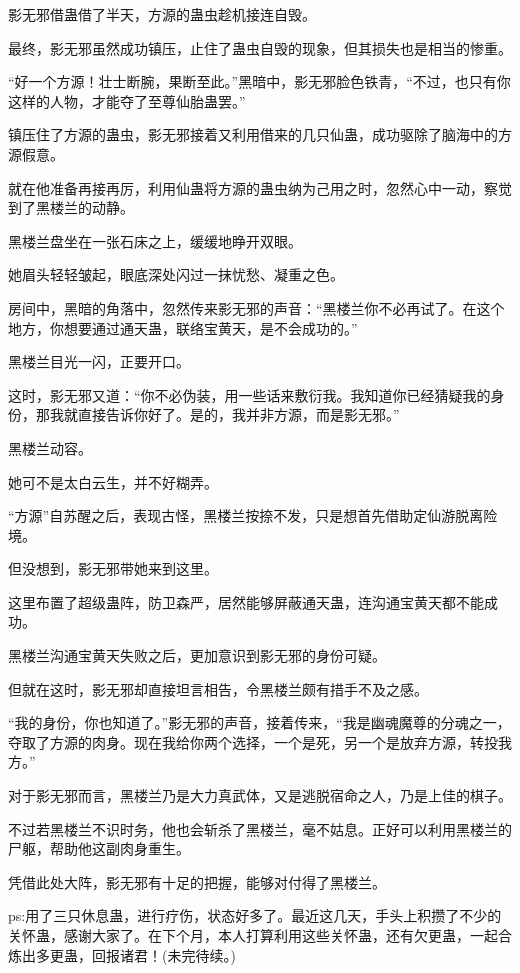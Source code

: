 \begin{this_body}
影无邪借蛊借了半天，方源的蛊虫趁机接连自毁。

最终，影无邪虽然成功镇压，止住了蛊虫自毁的现象，但其损失也是相当的惨重。

“好一个方源！壮士断腕，果断至此。”黑暗中，影无邪脸色铁青，“不过，也只有你这样的人物，才能夺了至尊仙胎蛊罢。”

镇压住了方源的蛊虫，影无邪接着又利用借来的几只仙蛊，成功驱除了脑海中的方源假意。

就在他准备再接再厉，利用仙蛊将方源的蛊虫纳为己用之时，忽然心中一动，察觉到了黑楼兰的动静。

黑楼兰盘坐在一张石床之上，缓缓地睁开双眼。

她眉头轻轻皱起，眼底深处闪过一抹忧愁、凝重之色。

房间中，黑暗的角落中，忽然传来影无邪的声音：“黑楼兰你不必再试了。在这个地方，你想要通过通天蛊，联络宝黄天，是不会成功的。”

黑楼兰目光一闪，正要开口。

这时，影无邪又道：“你不必伪装，用一些话来敷衍我。我知道你已经猜疑我的身份，那我就直接告诉你好了。是的，我并非方源，而是影无邪。”

黑楼兰动容。

她可不是太白云生，并不好糊弄。

“方源”自苏醒之后，表现古怪，黑楼兰按捺不发，只是想首先借助定仙游脱离险境。

但没想到，影无邪带她来到这里。

这里布置了超级蛊阵，防卫森严，居然能够屏蔽通天蛊，连沟通宝黄天都不能成功。

黑楼兰沟通宝黄天失败之后，更加意识到影无邪的身份可疑。

但就在这时，影无邪却直接坦言相告，令黑楼兰颇有措手不及之感。

“我的身份，你也知道了。”影无邪的声音，接着传来，“我是幽魂魔尊的分魂之一，夺取了方源的肉身。现在我给你两个选择，一个是死，另一个是放弃方源，转投我方。”

对于影无邪而言，黑楼兰乃是大力真武体，又是逃脱宿命之人，乃是上佳的棋子。

不过若黑楼兰不识时务，他也会斩杀了黑楼兰，毫不姑息。正好可以利用黑楼兰的尸躯，帮助他这副肉身重生。

凭借此处大阵，影无邪有十足的把握，能够对付得了黑楼兰。

ps:用了三只休息蛊，进行疗伤，状态好多了。最近这几天，手头上积攒了不少的关怀蛊，感谢大家了。在下个月，本人打算利用这些关怀蛊，还有欠更蛊，一起合炼出多更蛊，回报诸君！(未完待续。)

\end{this_body}

